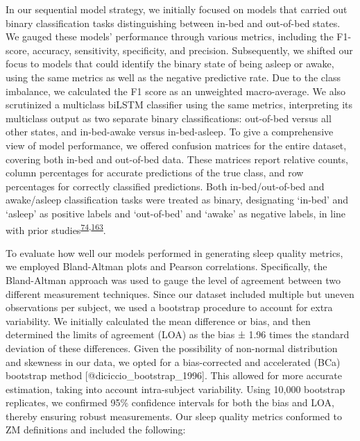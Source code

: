 \documentclass[
  10pt,
]{scrbook}
\begin{document}
In our sequential model strategy, we initially focused on models that
carried out binary classification tasks distinguishing between in-bed
and out-of-bed states. We gauged these models' performance through
various metrics, including the F1-score, accuracy, sensitivity,
specificity, and precision. Subsequently, we shifted our focus to models
that could identify the binary state of being asleep or awake, using the
same metrics as well as the negative predictive rate. Due to the class
imbalance, we calculated the F1 score as an unweighted macro-average. We
also scrutinized a multiclass biLSTM classifier using the same metrics,
interpreting its multiclass output as two separate binary
classifications: out-of-bed versus all other states, and in-bed-awake
versus in-bed-asleep. To give a comprehensive view of model performance,
we offered confusion matrices for the entire dataset, covering both
in-bed and out-of-bed data. These matrices report relative counts,
column percentages for accurate predictions of the true class, and row
percentages for correctly classified predictions. Both in-bed/out-of-bed
and awake/asleep classification tasks were treated as binary,
designating `in-bed' and `asleep' as positive labels and `out-of-bed'
and `awake' as negative labels, in line with prior
studies\textsuperscript{\protect\hyperlink{ref-hjorth_measure_2012}{74},\protect\hyperlink{ref-kushida_comparison_2001}{163}}.

To evaluate how well our models performed in generating sleep quality
metrics, we employed Bland-Altman plots and Pearson correlations.
Specifically, the Bland-Altman approach was used to gauge the level of
agreement between two different measurement techniques. Since our
dataset included multiple but uneven observations per subject, we used a
bootstrap procedure to account for extra variability. We initially
calculated the mean difference or bias, and then determined the limits
of agreement (LOA) as the bias ± 1.96 times the standard deviation of
these differences. Given the possibility of non-normal distribution and
skewness in our data, we opted for a bias-corrected and accelerated
(BCa) bootstrap method {[}@diciccio\_bootstrap\_1996{]}. This allowed
for more accurate estimation, taking into account intra-subject
variability. Using 10,000 bootstrap replicates, we confirmed 95\%
confidence intervals for both the bias and LOA, thereby ensuring robust
measurements. Our sleep quality metrics conformed to ZM definitions and
included the following:
\end{document}

